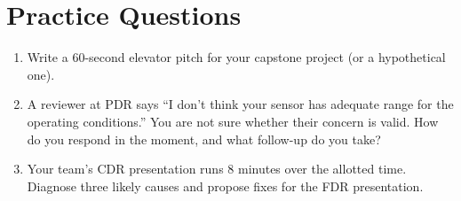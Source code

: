 \section{Practice Questions}
\begin{enumerate}[leftmargin=1.5em]
\item Write a 60-second elevator pitch for your capstone project (or a hypothetical one).
\item A reviewer at PDR says ``I don't think your sensor has adequate range for the operating conditions.'' You are not sure whether their concern is valid. How do you respond in the moment, and what follow-up do you take?
\item Your team's CDR presentation runs 8 minutes over the allotted time. Diagnose three likely causes and propose fixes for the FDR presentation.
\end{enumerate}


